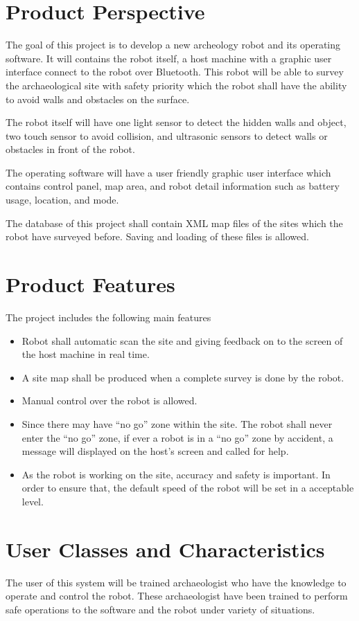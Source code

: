 \documentclass[11pt, a4paper]{report}
\begin{document}
\section{Product Perspective}
The goal of this project is to develop a new archeology robot and its operating software. It will contains the robot itself, a host machine with a graphic user interface connect to the robot over Bluetooth. This robot will be able to survey the archaeological site with safety priority which the robot shall have the ability to avoid walls and obstacles on the surface. 

The robot itself will have one light sensor to detect the hidden walls and object, two touch sensor to avoid collision, and ultrasonic sensors to detect walls or obstacles in front of the robot. 

The operating software will have a user friendly graphic user interface which contains control panel, map area, and robot detail information such as battery usage, location, and mode. 

The database of this project shall contain XML map files of the sites which the robot have surveyed before. Saving and loading of these files is allowed. 

\section{Product Features}
The project includes the following main features
\begin{itemize}
\item Robot shall automatic scan the site and giving feedback on to the screen of the host machine in real time. 
\item A site map shall be produced when a complete survey is done by the robot.
\item Manual control over the robot is allowed. 
\item Since there may have “no go” zone within the site. The robot shall never enter the “no go” zone, if ever a robot is in a “no go” zone by accident, a message will displayed on the host's screen and called for help.
\item As the robot is working on the site, accuracy and safety is important. In order to ensure that, the default speed of the robot will be set in a acceptable level. 
\end{itemize}

\section{User Classes and Characteristics}
The user of this system will be trained archaeologist who have the knowledge to operate and control the robot. These archaeologist have been trained to perform safe operations to the software and the robot under variety of situations.
\end{document}
